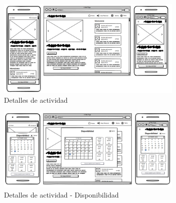 \begin{figure}[H]
	\centering
	\includegraphics[width=0.8\textwidth]{5-AnalisisDelSistemaDeInformacion/InterfacesDeUsuario/Detalles de actividad/detalles-estandar.png}
	\caption{Detalles de actividad}
\end{figure}

\begin{figure}[H]
	\centering
	\includegraphics[width=0.8\textwidth]{5-AnalisisDelSistemaDeInformacion/InterfacesDeUsuario/Detalles de actividad/detalles-estandar-disponibilidad.png}
	\caption{Detalles de actividad - Disponibilidad}
\end{figure}